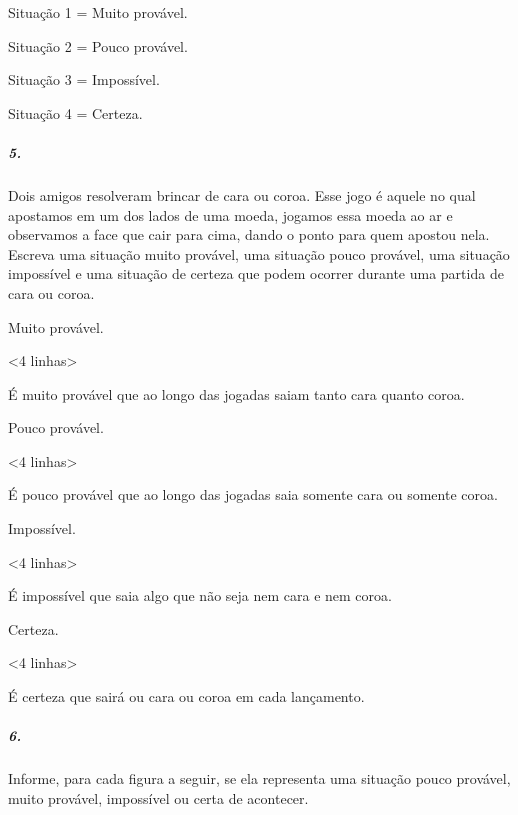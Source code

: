 Situação 1 = Muito provável.

Situação 2 = Pouco provável.

Situação 3 = Impossível.

Situação 4 = Certeza.

\subparagraph{5.}\label{section-72}

Dois amigos resolveram brincar de cara ou coroa. Esse jogo é aquele no
qual apostamos em um dos lados de uma moeda, jogamos essa moeda ao ar e observamos a face
que cair para cima, dando o ponto para quem apostou nela. Escreva uma
situação muito provável, uma situação pouco provável, uma situação
impossível e uma situação de certeza que podem ocorrer durante uma partida de cara ou coroa.

Muito provável.

\textless{}4 linhas\textgreater{}

É muito provável que ao longo das jogadas saiam tanto cara quanto coroa.

Pouco provável.

\textless{}4 linhas\textgreater{}

É pouco provável que ao longo das jogadas saia somente cara ou somente coroa.

Impossível.

\textless{}4 linhas\textgreater{}

É impossível que saia algo que não seja nem cara e nem coroa.

Certeza.

\textless{}4 linhas\textgreater{}

É certeza que sairá ou cara ou coroa em cada lançamento.

\subparagraph{6.}\label{section-73}

Informe, para cada figura a seguir, se ela representa uma situação pouco
provável, muito provável, impossível ou certa de acontecer.

